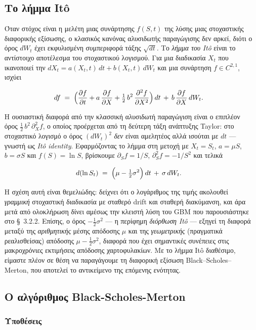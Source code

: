 \documentclass[12pt]{article}
\begin{document}
\subsection{Το λήμμα Itô}

Όταν στόχος είναι η μελέτη μιας συνάρτησης $f(S, t)$ της λύσης μιας στοχαστικής διαφορικής εξίσωσης, ο κλασικός κανόνας αλυσιδωτής παραγώγισης δεν αρκεί, διότι ο όρος $dW_t$ έχει εκφυλισμένη συμπεριφορά τάξης $\sqrt{dt}$. Το \emph{λήμμα του Itô} είναι το αντίστοιχο αποτέλεσμα του στοχαστικού λογισμού. Για μια διαδικασία $X_t$ που ικανοποιεί την $dX_t = a(X_t, t)\,dt + b(X_t, t)\,dW_t$ και μια συνάρτηση $f \in C^{2,1}$, ισχύει

$$
df \;=\; \Bigl(\frac{\partial f}{\partial t} + a\,\frac{\partial f}{\partial X} + \tfrac{1}{2}\,b^2\,\frac{\partial^2 f}{\partial X^2}\Bigr)\,dt \,+\, b\,\frac{\partial f}{\partial X}\,dW_t.
$$

Η ουσιαστική διαφορά από την κλασσική αλυσιδωτή παραγώγιση είναι ο επιπλέον όρος $\tfrac12\,b^2\,\partial^2_X f$, ο οποίος προέρχεται από τη δεύτερη τάξη ανάπτυξης Taylor: στο στοχαστικό λογισμό ο όρος $(dW_t)^2$ \emph{δεν} είναι αμελητέος αλλά ισούται με $dt$ — γνωστή ως \emph{Itô identity}. Εφαρμόζοντας το λήμμα στη μετοχή με $X_t = S_t$, $a = \mu S$, $b = \sigma S$ και $f(S) = \ln S$, βρίσκουμε $\partial_S f = 1/S$, $\partial^2_S f = -1/S^2$ και τελικά

$$
d(\ln S_t) \;=\; \Bigl(\mu - \tfrac{1}{2}\sigma^2\Bigr)\,dt \,+\, \sigma\,dW_t.
$$

Η σχέση αυτή είναι θεμελιώδης: δείχνει ότι ο λογάριθμος της τιμής ακολουθεί \emph{γραμμική} στοχαστική διαδικασία με σταθερό drift και σταθερή διακύμανση, και άρα μετά από ολοκλήρωση δίνει αμέσως την κλειστή λύση του GBM που παρουσιάστηκε στο \S~3.2.2. Επίσης, ο όρος $-\tfrac12 \sigma^2$ — η περίφημη \emph{διόρθωση Itô} — εξηγεί τη διαφορά μεταξύ της \emph{αριθμητικής} μέσης απόδοσης $\mu$ και της \emph{γεωμετρικής} (πραγματικά ρεαλισθείσας) απόδοσης $\mu - \tfrac12\sigma^2$, διαφορά που έχει σημαντικές συνέπειες στις μακροχρόνιες εκτιμήσεις απόδοσης χαρτοφυλακίων. Με το λήμμα Itô διαθέσιμο, είμαστε πλέον σε θέση να παραγάγουμε τη διαφορική εξίσωση Black–Scholes–Merton, που αποτελεί το αντικείμενο της επόμενης ενότητας.

\subsection{Ο αλγόριθμος Black-Scholes-Merton}
\subsubsection{Υποθέσεις}
\end{document}
